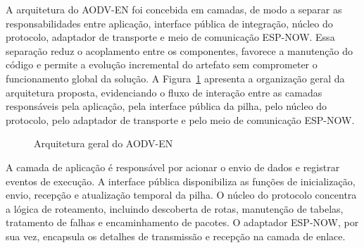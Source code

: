 A arquitetura do AODV-EN foi concebida em camadas, de modo a
separar as responsabilidades entre aplicação, interface pública de
integração, núcleo do protocolo, adaptador de transporte e meio de
comunicação ESP-NOW. Essa separação reduz o acoplamento entre os
componentes, favorece a manutenção do código e permite a evolução
incremental do artefato sem comprometer o funcionamento global da
solução. A Figura~\ref{fig:arquitetura} apresenta a organização geral da arquitetura
proposta, evidenciando o fluxo de interação entre as camadas
responsáveis pela aplicação, pela interface pública da pilha, pelo
núcleo do protocolo, pelo adaptador de transporte e pelo meio de
comunicação ESP-NOW.
\begin{figure}[H]
\centering
{}
\caption{Arquitetura geral do AODV-EN}\label{fig:arquitetura}
\end{figure}
A camada de aplicação é responsável por acionar o envio de dados e
registrar eventos de execução. A interface pública disponibiliza as
funções de inicialização, envio, recepção e atualização temporal da
pilha. O núcleo do protocolo concentra a lógica de roteamento, incluindo
descoberta de rotas, manutenção de tabelas, tratamento de falhas e
encaminhamento de pacotes. O adaptador ESP-NOW, por sua vez, encapsula
os detalhes de transmissão e recepção na camada de enlace.

